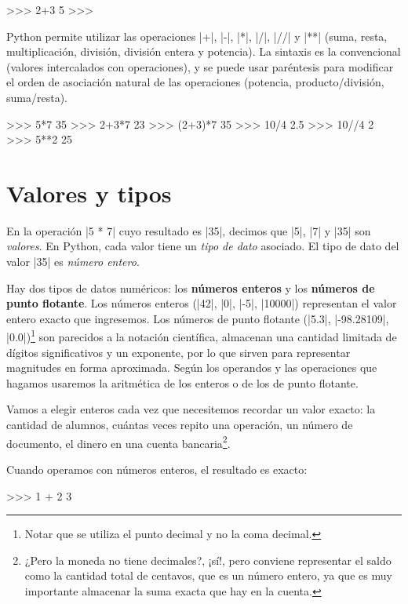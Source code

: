 \begin{codigo-python-sn}
>>> 2+3
5
>>>
\end{codigo-python-sn}

Python permite utilizar las operaciones |+|, |-|, |*|, |/|, |//| y |**|
(suma, resta, multiplicación, división, división entera y potencia). La sintaxis es la
convencional (valores intercalados con operaciones), y se puede usar
paréntesis para modificar el orden de asociación natural de las operaciones
(potencia, producto/división, suma/resta).

\begin{codigo-python-sn}
>>> 5*7
35
>>> 2+3*7
23
>>> (2+3)*7
35
>>> 10/4
2.5
>>> 10//4
2
>>> 5**2
25
\end{codigo-python-sn}

\section{Valores y tipos}

En la operación |5 * 7| cuyo resultado es |35|, decimos que |5|, |7| y |35|
son \emph{valores}. En Python, cada valor tiene un \emph{tipo de dato} asociado. El
tipo de dato del valor |35| es \emph{número entero}.

\label{punto-flotante}
Hay dos tipos de datos numéricos: los {\bf números enteros} y los
{\bf números de punto flotante}. Los números enteros (|42|, |0|, |-5|,
|10000|) representan el valor entero exacto que
ingresemos. Los números de punto flotante (|5.3|, |-98.28109|,
|0.0|)\footnote{Notar que se utiliza el punto decimal y no la coma decimal.} son
parecidos a la notación científica,
almacenan una cantidad limitada de dígitos significativos y un exponente, por
lo que sirven para representar magnitudes en forma aproximada. Según
los operandos y las operaciones que hagamos usaremos la aritmética de los
enteros o de los de punto flotante.

Vamos a elegir enteros cada vez que necesitemos recordar un valor exacto:
la cantidad de alumnos, cuántas veces repito una operación, un número de
documento, el dinero en una cuenta bancaria\footnote{¿Pero la moneda no tiene
decimales?, ¡sí!, pero conviene representar el saldo como la cantidad total de
centavos, que es un número entero, ya que es muy importante almacenar la suma exacta
que hay en la cuenta.}.

Cuando operamos con números enteros, el resultado es exacto:

\begin{codigo-python-sn}
>>> 1 + 2
3
\end{codigo-python-sn}

